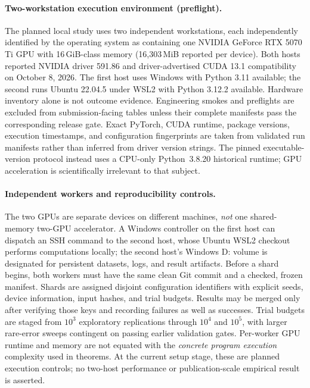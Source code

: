 \paragraph{Two-workstation execution environment (preflight).}
The planned local study uses two independent workstations, each independently
identified by the operating system as containing one NVIDIA GeForce RTX 5070 Ti
GPU with 16\,GiB-class memory (16{,}303\,MiB reported per device).
Both hosts reported NVIDIA driver 591.86 and driver-advertised CUDA 13.1
compatibility on October 8, 2026. The first host uses Windows with Python
3.11 available; the second runs Ubuntu 22.04.5 under WSL2 with Python 3.12.2
available. Hardware inventory alone is not outcome evidence. Engineering
smokes and preflights are excluded from submission-facing tables unless their
complete manifests pass the corresponding release gate. Exact PyTorch, CUDA
runtime, package versions, execution timestamps, and configuration
fingerprints are taken from validated run manifests rather than inferred from
driver version strings. The pinned executable-version protocol instead uses a
CPU-only Python~3.8.20 historical runtime; GPU acceleration is scientifically
irrelevant to that subject.

\paragraph{Independent workers and reproducibility controls.}
The two GPUs are separate devices on different machines, \emph{not} one
shared-memory two-GPU accelerator. A Windows controller on the first host
can dispatch an SSH command to the second host, whose Ubuntu WSL2 checkout
performs computations locally; the second host's Windows D: volume is
designated for persistent datasets, logs, and result artifacts. Before a
shard begins, both workers must have the same clean Git commit and
a checked, frozen manifest. Shards are assigned disjoint configuration
identifiers with explicit seeds, device information, input hashes, and
trial budgets. Results may be merged only after verifying those keys and
recording failures as well as successes. Trial budgets are staged from
$10^3$ exploratory replications through $10^4$ and $10^5$, with larger
rare-error sweeps contingent on passing earlier validation gates.
Per-worker GPU runtime and memory are not equated with the
\emph{concrete program execution} complexity used in theorems.
At the current setup stage, these are planned execution controls; no
two-host performance or publication-scale empirical result is asserted.


